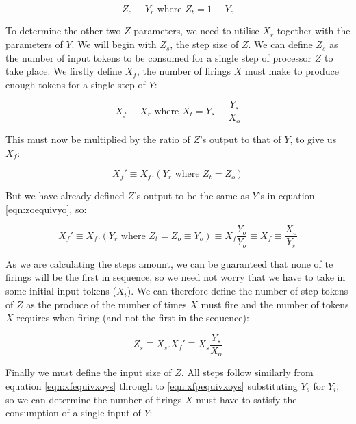 \begin{equation}\label{eqn:zoequivyo}
Z_o \equiv Y_r \text{ where } Z_t = 1 \equiv Y_o
\end{equation}

To determine the other two $Z$ parameters, we need to utilise $X_r$ together with the parameters of $Y$. We will begin with $Z_s$, the step size of $Z$. We can define $Z_s$ as the number of input tokens to be consumed for a single step of processor $Z$ to take place. We firstly define $X_f$, the number of firings $X$ must make to produce enough tokens for a single step of $Y$:

\begin{equation}\label{eqn:xfequivxoys}
X_f \equiv X_r \text{ where } X_t = Y_s \equiv \frac{Y_s}{X_o}
\end{equation}

This must now be multiplied by the ratio of $Z$'s output to that of $Y$, to give us $X_f$:

\begin{equation}
X_f' \equiv X_f.(Y_r \text{ where } Z_t = Z_o)
\end{equation}

But we have already defined $Z$'s output to be the same as $Y$'s in equation \ref{eqn:zoequivyo}, so:

\begin{equation}\label{eqn:xfpequivxoys}
X_f' \equiv X_f.(Y_r \text{ where } Z_t = Z_o \equiv Y_o) \equiv X_f \frac{Y_o}{Y_o} \equiv X_f \equiv \frac{X_o}{Y_s}
\end{equation}

As we are calculating the steps amount, we can be guaranteed that none of te firings will be the first in sequence, so we need not worry that we have to take in some initial input tokens ($X_i$). We can therefore define the number of step tokens of $Z$ as the produce of the number of times $X$ must fire and the number of tokens $X$ requires when firing (and not the first in the sequence):

\begin{equation}
Z_s \equiv X_s.X_f' \equiv X_s\frac{Y_s}{X_o}
\end{equation}

Finally we must define the input size of $Z$. All steps follow similarly from equation \ref{eqn:xfequivxoys} through to \ref{eqn:xfpequivxoys} substituting $Y_s$ for $Y_i$, so we can determine the number of firings $X$ must have to satisfy the consumption of a single input of $Y$:

